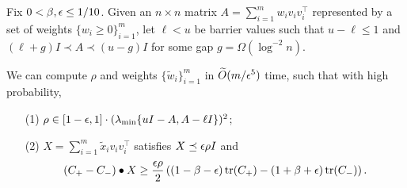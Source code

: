 \begin{lemma}
\label{lem:sdp-computation}
Fix $0 < \beta,\epsilon \le 1/10$. %
Given an $n \times n$ matrix $A = \sum_{i=1}^m w_i v_i v_i^\top$ represented by a set of weights $\{w_i \ge 0\}_{i=1}^m$, let $\ell < u$ be barrier values such that $u - \ell \le 1$ and $(\ell + g) I \prec A \prec (u - g) I$ for some gap $g = \Omega(\log^{-2} n)$.

We can compute $\rho$ and weights $\{\tilde w_i\}_{i=1}^m$ in $\widetilde O(m / \epsilon^{5})$ time, such that with high probability,
\begin{enumerate}
\item[(1)] $\rho \in [1-\epsilon, 1] \cdot (\lambda_{\min}\{u I - A, A - \ell I\})^2$;
\item[(2)] $X = \sum_{i=1}^m \tilde x_i v_i v_i^\top$ satisfies $X \preceq \epsilon\rho I$ and
\[
(C_+ - C_-) \bullet X \ge \frac{\epsilon \rho}{2} \left((1-\beta-\epsilon)\operatorname{tr}(C_+) - (1+\beta+\epsilon)\operatorname{tr}(C_-)\right).
\]
\end{enumerate}
\end{lemma}
